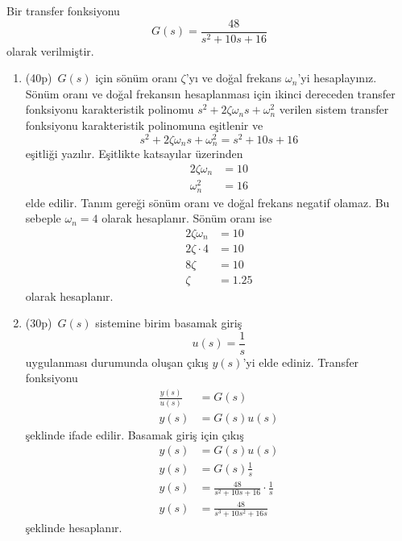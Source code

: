 Bir transfer fonksiyonu
\begin{equation}
    G(s)=\frac{48}{s^2+10s+16}
\end{equation}
olarak verilmiştir.
\begin{enumerate}
    \item(40p)\, $G(s)$ için sönüm oranı $\zeta$'yı ve doğal frekans $\omega_n$'yi hesaplayınız.
    Sönüm oranı ve doğal frekansın hesaplanması için ikinci dereceden transfer fonksiyonu karakteristik polinomu $s^2+2\zeta\omega_ns+\omega_n^2$ verilen sistem transfer fonksiyonu karakteristik polinomuna eşitlenir ve 
    \begin{equation}
        s^2+2\zeta\omega_ns+\omega_n^2=s^2+10s+16
    \end{equation}
    eşitliği yazılır. Eşitlikte katsayılar üzerinden
    \begin{equation}
        \begin{split}
            2\zeta\omega_n&=10\\
            \omega_n^2&=16
        \end{split}
    \end{equation}
    elde edilir. Tanım gereği sönüm oranı ve doğal frekans negatif olamaz. Bu sebeple $\omega_n=4$ olarak hesaplanır. Sönüm oranı ise
    \begin{equation}
        \begin{split}
            2\zeta\omega_n&=10\\
            2\zeta\cdot 4&=10\\
            8\zeta&=10\\
            \zeta&=1.25
        \end{split}
    \end{equation}
    olarak hesaplanır. 

    \item(30p)\, $G(s)$ sistemine birim basamak giriş
    \begin{equation}
        u(s)=\frac{1}{s}
    \end{equation}
    uygulanması durumunda oluşan çıkış $y(s)$'yi elde ediniz. Transfer fonksiyonu
    \begin{equation}
    \begin{split}
        \frac{y(s)}{u(s)}&=G(s)\\
        y(s)&=G(s)u(s)
    \end{split}
    \end{equation}
    şeklinde ifade edilir. Basamak giriş için çıkış
    \begin{equation}
    \begin{split}
        y(s)&=G(s)u(s)\\
        y(s)&=G(s)\frac{1}{s}\\
        y(s)&=\frac{48}{s^2+10s+16}\cdot \frac{1}{s}\\
        y(s)&=\frac{48}{s^3+10s^2+16s}
    \end{split}
    \end{equation}
    şeklinde hesaplanır. 
    

\end{enumerate}
